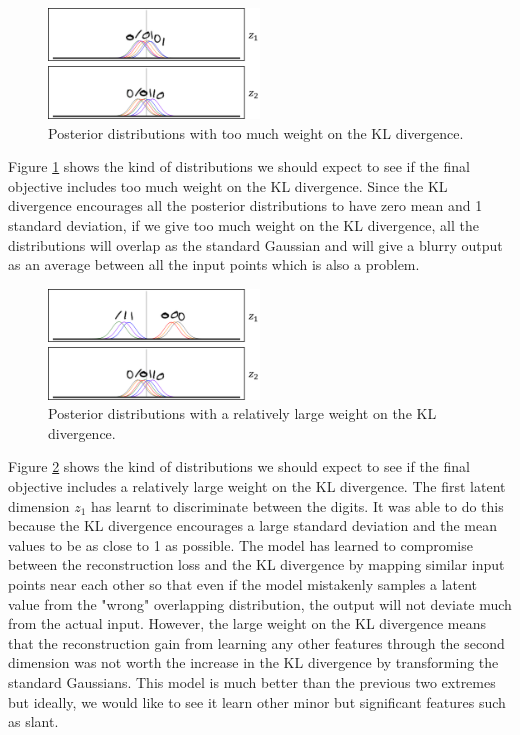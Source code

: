             \begin{figure}[H]
                \centering
                \includegraphics[width=0.5\textwidth]{imgs/1d_beta_size2.png}
                \caption{Posterior distributions with too much weight on the KL divergence.}
                \label{fig:1d_beta_size2}
            \end{figure}
            
            Figure \ref{fig:1d_beta_size2} shows the kind of distributions we should expect to see if the final objective includes too much weight on the KL divergence. Since the KL divergence encourages all the posterior distributions to have zero mean and 1 standard deviation, if we give too much weight on the KL divergence, all the distributions will overlap as the standard Gaussian and will give a blurry output as an average between all the input points which is also a problem.
            
            \begin{figure}[H]
                \centering
                \includegraphics[width=0.5\textwidth]{imgs/1d_beta_size3.png}
                \caption{Posterior distributions with a relatively large weight on the KL divergence.}
                \label{fig:1d_beta_size3}
            \end{figure}
            
            Figure \ref{fig:1d_beta_size3} shows the kind of distributions we should expect to see if the final objective includes a relatively large weight on the KL divergence. The first latent dimension $z_1$ has learnt to discriminate between the digits. It was able to do this because the KL divergence encourages a large standard deviation and the mean values to be as close to 1 as possible. The model has learned to compromise between the reconstruction loss and the KL divergence by mapping similar input points near each other so that even if the model mistakenly samples a latent value from the "wrong" overlapping distribution, the output will not deviate much from the actual input. However, the large weight on the KL divergence means that the reconstruction gain from learning any other features through the second dimension was not worth the increase in the KL divergence by transforming the standard Gaussians. This model is much better than the previous two extremes but ideally, we would like to see it learn other minor but significant features such as slant.
            
